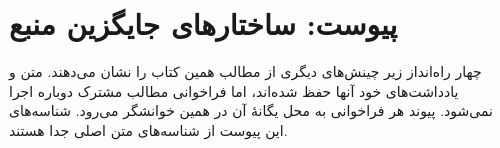 \clearpage
{}
\begingroup
\makeatletter
\let\c@section\c@OLSAVariantSection
\makeatother
\renewcommand{\thesection}{A.\arabic{OLSAVariantSection}}
\renewcommand{\theHsection}{olsa-variant.\arabic{OLSAVariantSection}}
\chapter*{پیوست: ساختارهای جایگزین منبع}
\noindent
چهار راه‌انداز زیر چینش‌های دیگری از مطالب همین کتاب را نشان می‌دهند.
متن و یادداشت‌های خود آنها حفظ شده‌اند، اما فراخوانی مطالب مشترک
دوباره اجرا نمی‌شود. پیوند هر فراخوانی به محل یگانهٔ آن در همین
خوانشگر می‌رود. شناسه‌های این پیوست از شناسه‌های متن اصلی جدا هستند.
\par\medskip
{}
\clearpage
\endgroup
